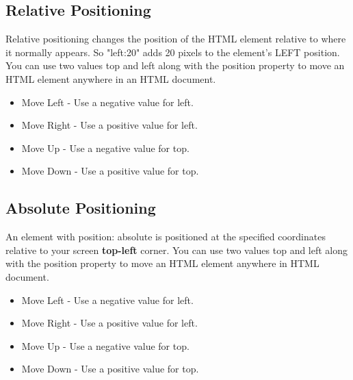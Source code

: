 \documentclass{report}
\begin{document}
    \subsection{Relative Positioning}
    \bigbreak \noindent 
    Relative positioning changes the position of the HTML element relative to where
    it normally appears. So "left:20" adds 20 pixels to the element's LEFT position.
    \bigbreak \noindent 
    You can use two values top and left along with the position property to move an
    HTML element anywhere in an HTML document.
    \begin{itemize}
        \item Move Left - Use a negative value for left.
        \item Move Right - Use a positive value for left.
        \item Move Up - Use a negative value for top.
        \item Move Down - Use a positive value for top.
    \end{itemize}
    \bigbreak \noindent 
    \bigbreak \noindent 

    \pagebreak \bigbreak \noindent 
    \subsection{Absolute Positioning}
    \bigbreak \noindent 
    An element with position: absolute is positioned at the specified coordinates
    relative to your screen \textbf{top-left} corner.
    \bigbreak \noindent 
    You can use two values top and left along with the position property to move an
    HTML element anywhere in HTML document.
    \begin{itemize}
        \item Move Left - Use a negative value for left.
        \item Move Right - Use a positive value for left.
        \item Move Up - Use a negative value for top.
        \item Move Down - Use a positive value for top.
    \end{itemize}
    \bigbreak \noindent 
    \bigbreak \noindent 
\end{document}
